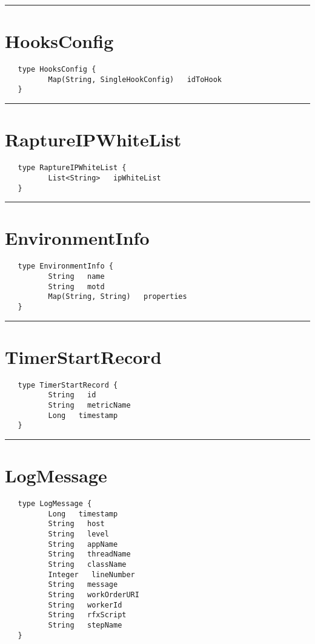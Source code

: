 \rule{12cm}{2pt}
\section{HooksConfig}
\label{type:HooksConfig}

\begin{Verbatim}
   type HooksConfig {
          Map(String, SingleHookConfig)   idToHook
   }
\end{Verbatim}

\rule{12cm}{2pt}
\section{RaptureIPWhiteList}
\label{type:RaptureIPWhiteList}

\begin{Verbatim}
   type RaptureIPWhiteList {
          List<String>   ipWhiteList
   }
\end{Verbatim}

\rule{12cm}{2pt}
\section{EnvironmentInfo}
\label{type:EnvironmentInfo}

\begin{Verbatim}
   type EnvironmentInfo {
          String   name
          String   motd
          Map(String, String)   properties
   }
\end{Verbatim}

\rule{12cm}{2pt}
\section{TimerStartRecord}
\label{type:TimerStartRecord}

\begin{Verbatim}
   type TimerStartRecord {
          String   id
          String   metricName
          Long   timestamp
   }
\end{Verbatim}

\rule{12cm}{2pt}
\section{LogMessage}
\label{type:LogMessage}

\begin{Verbatim}
   type LogMessage {
          Long   timestamp
          String   host
          String   level
          String   appName
          String   threadName
          String   className
          Integer   lineNumber
          String   message
          String   workOrderURI
          String   workerId
          String   rfxScript
          String   stepName
   }
\end{Verbatim}

